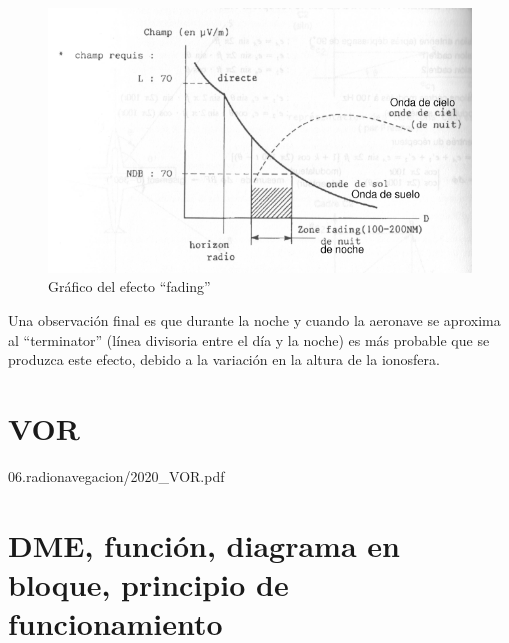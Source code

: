 \begin{description}
\begin{description}
\begin{figure}[!htb]
  \centering
  \includegraphics[width=\textwidth]{06.radionavegacion/Imagenes/06.01.adf/grafico-fading.png}
  \caption{ Gr\'afico del efecto ``fading''}
  \label{fig:fading}
\end{figure}

Una observaci\'on final es que durante la noche y cuando la aeronave se aproxima al ``terminator'' (l\'inea divisoria entre el d\'ia y la noche) es m\'as probable que se produzca este efecto, debido a la variaci\'on en la altura de la ionosfera.
\end{description}

\end{description}





 \newpage 

\section{VOR}
\label{sec:06.VOR}

  
  {06.radionavegacion/2020_VOR.pdf}


\clearpage




  
\section{DME, función, diagrama en bloque, principio de funcionamiento}
\label{sec:U06.04.DME}

